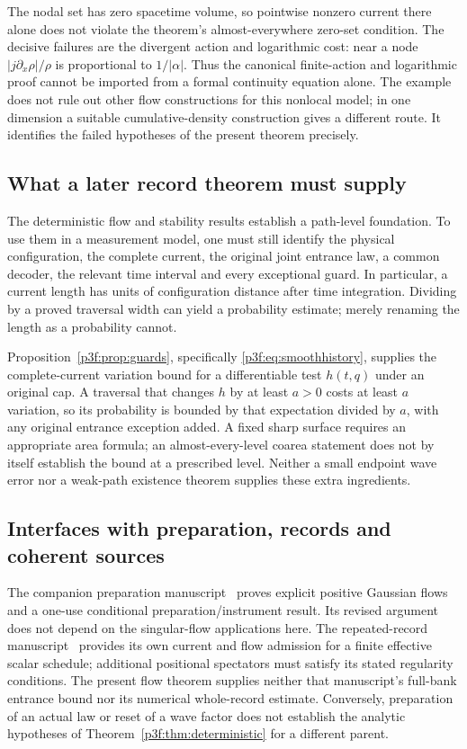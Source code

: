 \documentclass[11pt]{article}
\numberwithin{equation}{section}
\theoremstyle{definition}
\theoremstyle{remark}
\begin{document}
The nodal set has zero spacetime volume, so pointwise nonzero current there alone does not violate the theorem's almost-everywhere zero-set condition. The decisive failures are the divergent action and logarithmic cost: near a node $|j\partial_x\rho|/\rho$ is proportional to $1/|\alpha|$. Thus the canonical finite-action and logarithmic proof cannot be imported from a formal continuity equation alone. The example does not rule out other flow constructions for this nonlocal model; in one dimension a suitable cumulative-density construction gives a different route. It identifies the failed hypotheses of the present theorem precisely.

\subsection{What a later record theorem must supply}\label{p3r:interface}
The deterministic flow and stability results establish a path-level foundation. To use them in a measurement model, one must still identify the physical configuration, the complete current, the original joint entrance law, a common decoder, the relevant time interval and every exceptional guard. In particular, a current length has units of configuration distance after time integration. Dividing by a proved traversal width can yield a probability estimate; merely renaming the length as a probability cannot.

Proposition~\ref{p3f:prop:guards}, specifically \eqref{p3f:eq:smoothhistory}, supplies the complete-current variation bound for a differentiable test $h(t,q)$ under an original cap. A traversal that changes $h$ by at least $a>0$ costs at least $a$ variation, so its probability is bounded by that expectation divided by $a$, with any original entrance exception added. A fixed sharp surface requires an appropriate area formula; an almost-every-level coarea statement does not by itself establish the bound at a prescribed level. Neither a small endpoint wave error nor a weak-path existence theorem supplies these extra ingredients.

\subsection{Interfaces with preparation, records and coherent sources}
The companion preparation manuscript~\cite{RodgersP1} proves explicit
positive Gaussian flows and a one-use conditional preparation/instrument
result. Its revised argument does not depend on the singular-flow
applications here. The repeated-record manuscript~\cite{RodgersP2}
provides its own current and flow admission for a finite effective
scalar schedule; additional positional spectators must satisfy its
stated regularity conditions. The present flow theorem supplies
neither that manuscript's full-bank entrance bound nor its numerical
whole-record estimate. Conversely, preparation of an actual law or
reset of a wave factor does not establish the analytic hypotheses of
Theorem~\ref{p3f:thm:deterministic} for a different parent.
\end{document}
